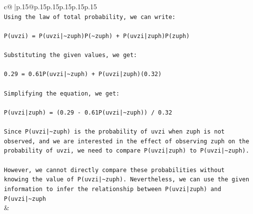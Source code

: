 \documentclass{article}
\begin{document}
{\begin{supertabular}{c@{$\;$}|p{.15\linewidth}@{}p{.15\linewidth}p{.15\linewidth}p{.15\linewidth}p{.15\linewidth}p{.15\linewidth}}
{{{\\ 
\texttt{Using the law of total probability, we can write:} \\
\\ 
\texttt{P(uvzi) = P(uvzi|\textasciitilde{}zuph)P(\textasciitilde{}zuph) + P(uvzi|zuph)P(zuph)} \\
\\ 
\texttt{Substituting the given values, we get:} \\
\\ 
\texttt{0.29 = 0.61P(uvzi|\textasciitilde{}zuph) + P(uvzi|zuph)(0.32)} \\
\\ 
\texttt{Simplifying the equation, we get:} \\
\\ 
\texttt{P(uvzi|zuph) = (0.29 {-} 0.61P(uvzi|\textasciitilde{}zuph)) / 0.32} \\
\\ 
\texttt{Since P(uvzi|\textasciitilde{}zuph) is the probability of uvzi when zuph is not observed, and we are interested in the effect of observing zuph on the probability of uvzi, we need to compare P(uvzi|zuph) to P(uvzi|\textasciitilde{}zuph).} \\
\\ 
\texttt{However, we cannot directly compare these probabilities without knowing the value of P(uvzi|\textasciitilde{}zuph). Nevertheless, we can use the given information to infer the relationship between P(uvzi|zuph) and P(uvzi|\textasciitilde{}zuph} \\
            }
        }
    }
    & \\ \\


\end{supertabular}}
\end{document}
